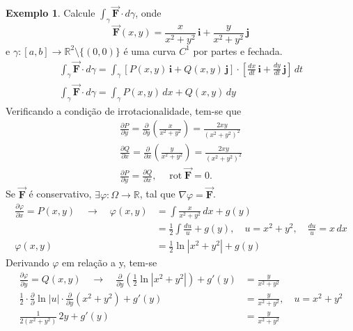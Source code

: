 \documentclass[11pt]{article}
\theoremstyle{definition}
\newtheorem{exemplo}{Exemplo}[subsection]
\begin{document}
	\begin{exemplo}
		Calcule $\int_{\gamma} \vec{\boldsymbol{F}}\cdot d\gamma$, onde
		\begin{equation*}
			\vec{\boldsymbol{F}}(x,y)=\frac{x}{x^2+y^2}\, \mathbf{i}+\frac{y}{x^2+y^2}\,\mathbf{j}
		\end{equation*}
		e $\gamma:[a,b]\to \mathbb{R}^2\setminus \{(0,0)\}$ é uma curva $C^1$ por partes e fechada.
		\begin{gather*}
			\int_{\gamma} \vec{\boldsymbol{F}}\cdot d\gamma=\int_{\gamma}\left[P(x,y)\,\mathbf{i}+Q(x,y)\,\mathbf{j}\right]\cdot \left[\frac{dx}{dt}\,\mathbf{i}+\frac{dy}{dt}\,\mathbf{j}\right]\, dt\\
			\int_{\gamma} \vec{\boldsymbol{F}}\cdot d\gamma=\int_{\gamma}P(x,y)\, dx+Q(x,y)\, dy
		\end{gather*}
		Verificando a condição de irrotacionalidade, tem-se que
		\begin{gather*}
			\frac{\partial P}{\partial y}=\frac{\partial}{\partial y}\left(\frac{x}{x^2+y^2}\right)=\frac{2xy}{(x^2+y^2)^2}\\
			\frac{\partial Q}{\partial x}=\frac{\partial}{\partial x}\left(\frac{y}{x^2+y^2}\right)=\frac{2xy}{(x^2+y^2)^2}\\
			\frac{\partial P}{\partial y}=\frac{\partial Q}{\partial x},
			\quad\operatorname{rot}\vec{\boldsymbol{F}}=0.
		\end{gather*}
		Se $\vec{\boldsymbol{F}}$ é conservativo, $\exists\varphi:\Omega\to \mathbb{R}$, tal que $\nabla\varphi=\vec{\boldsymbol{F}}$.
		\begin{align*}
			\frac{\partial \varphi}{\partial x}=P(x,y) \quad\longrightarrow\quad \varphi(x,y)&=\int \frac{x}{x^2+y^2}\,dx + g(y)\\
			&=\frac{1}{2}\int\frac{du}{u} + g(y),\quad u=x^2+y^2,\quad \frac{du}{u}=x\,dx\\
			\varphi(x,y)&=\frac{1}{2}\ln |x^2+y^2| + g(y)
		\end{align*}
		Derivando $\varphi$ em relação a y, tem-se
		\begin{align*}
			\frac{\partial \varphi}{\partial y}=Q(x,y) \quad\longrightarrow\quad \frac{\partial}{\partial y}\left(\frac{1}{2}\ln |x^2+y^2|\right)+g'(y)&=\frac{y}{x^2+y^2}\\
			\frac{1}{2}\cdot\frac{\partial}{\partial}\ln|u|\cdot\frac{\partial}{\partial y}(x^2+y^2)+g'(y)&=\frac{y}{x^2+y^2}, \quad u=x^2+y^2\\
			\frac{1}{2(x^2+y^2)}\,2y+g'(y)&=\frac{y}{x^2+y^2}\\

\end{align*}
\end{exemplo}
\end{document}
